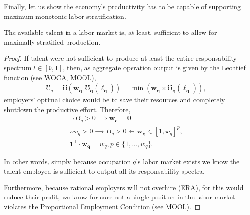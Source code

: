 \documentclass[hidelinks, nonatbib]{elsarticle}
\begin{document}
Finally, let us show the economy's productivity has to be capable of supporting maximum-monotonic labor stratification.
\begin{lemma}
    The available talent in a labor market is, at least, sufficient to allow for maximally stratified production.
    
    \begin{proof}
        If talent were not sufficient to produce at least the entire responsability spectrum $l \in [0,1]$, then, as aggregate operation output is given by the Leontief function (see WOCA, MOOL),
        \begin{gather}
        \mho_q = 
        \mho(
            \boldsymbol{w_q}
            ,
            \boldsymbol{\mho_q}(
                \boldsymbol{\ell_q}
            )
        ) = 
        \min\left(
            \boldsymbol{w_q}
            \times
            \boldsymbol{\mho_q}(
                \boldsymbol{\ell_q}
            )
        \right)
        ,
        \end{gather}
        employers' optimal choice would be to save their resources and completely shutdown the productive effort. Therefore,
        \begin{gather}
        \lnot \
        \mho_q > 0
        \implies
        \boldsymbol{w_q} =
        \boldsymbol{0}
        \\
        \therefore
        w_q > 0 
        \implies 
        \mho_q > 0
        \iff
        \boldsymbol{w_q}
        \in
        [1,w_q] ^ {p}
        ,
        \\
        \boldsymbol{1} ^ \top
        \cdot
        \boldsymbol{w_q}
        =
        w_q
        ,
        p \in \{1,\dots, w_q\}
        .
        \end{gather}
        
        In other words, simply because occupation $q$'s labor market exists we know the talent employed is sufficient to output all its responsability spectra.
        
        Furthermore, because rational employers will not overhire (ERA), for this would reduce their profit, we know for sure not a single position in the labor market violates the Proportional Employment Condition (see MOOL).
        

\end{proof}
\end{lemma}
\end{document}
